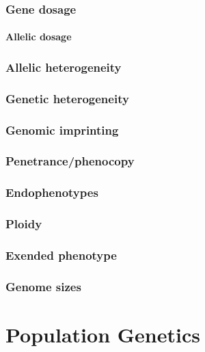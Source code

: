 \documentclass[]{book}
\theoremstyle{definition}
\theoremstyle{definition}
\theoremstyle{definition}
\theoremstyle{remark}
\begin{document}
\section{Gene dosage}\label{gene-dosage}

\subsection{Allelic dosage}\label{allelic-dosage}

\section{Allelic heterogeneity}\label{allelic-heterogeneity}

\section{Genetic heterogeneity}\label{genetic-heterogeneity}

\section{Genomic imprinting}\label{genomic-imprinting}

\section{Penetrance/phenocopy}\label{penetrancephenocopy}

\section{Endophenotypes}\label{endophenotypes}

\section{Ploidy}\label{ploidy}

\section{Exended phenotype}\label{exended-phenotype}

\section{Genome sizes}\label{genome-sizes}

\part{Population Genetics}\label{part-population-genetics}
\end{document}
